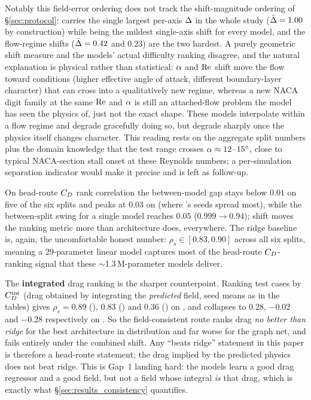 Notably this field-error ordering does not track the shift-magnitude ordering
of \S\ref{sec:protocol}:  carries the single largest
per-axis $\Delta$ in the whole study ($\bar{\Delta} = 1.00$ by construction)
while being the mildest single-axis shift for every model, and the
flow-regime shifts ($\bar{\Delta} = 0.42$ and $0.23$) are the two hardest. A
purely geometric shift measure and the models' actual difficulty ranking
disagree, and the natural explanation is physical rather than statistical:
$\alpha$ and $\mathrm{Re}$ shift move the flow toward conditions (higher effective
angle of attack, different boundary-layer character) that can cross into a
qualitatively new regime, whereas a new NACA digit family at the same $\mathrm{Re}$
and $\alpha$ is still an attached-flow problem the model has seen the physics
of, just not the exact shape. These models interpolate within a flow regime
and degrade gracefully doing so, but degrade sharply once the physics itself
changes character. This reading rests on the aggregate split numbers plus the
domain knowledge that the  test range crosses
$\alpha\approx12$--$15^{\circ}$, close to typical NACA-section stall onset at
these Reynolds numbers; a per-simulation separation indicator would make it
precise and is left as follow-up.

On head-route $C_D$ rank correlation the between-model gap stays below
$0.01$ on five of the six splits and peaks at $0.03$ on 
(where \Mtrans's seeds spread most), while the between-split swing for a
single model reaches $0.05$ ($0.999\to0.94$); shift moves the ranking metric
more than architecture does, everywhere. The ridge baseline is, again, the
uncomfortable honest number: $\rho_s\in[0.83,0.90]$ across all six splits,
meaning a 29-parameter linear model captures most of the head-route
$C_D$-ranking signal that these $\sim$1.3\,M-parameter models deliver.

The \textbf{integrated} drag ranking is the sharper counterpoint. Ranking test
cases by $C_D^{\text{int}}$ (drag obtained by integrating the \emph{predicted} field,
seed means as in the tables) gives $\rho_s = 0.89$ (\Mtrans), $0.83$ (\Mfno)
and $0.36$ (\Mgnn) on , and collapses to $0.28$, $-0.02$ and
$-0.28$ respectively on . So the field-consistent route
ranks drag \emph{no better than ridge} for the best architecture in
distribution and far worse for the graph net, and fails entirely under the
combined shift. Any ``beats ridge'' statement in this paper is therefore a
head-route statement; the drag implied by the predicted physics does not beat
ridge. This is Gap~1 landing hard: the models learn a good drag regressor and
a good field, but not a field whose integral \emph{is} that drag, which is
exactly what \S\ref{sec:results_consistency} quantifies.


